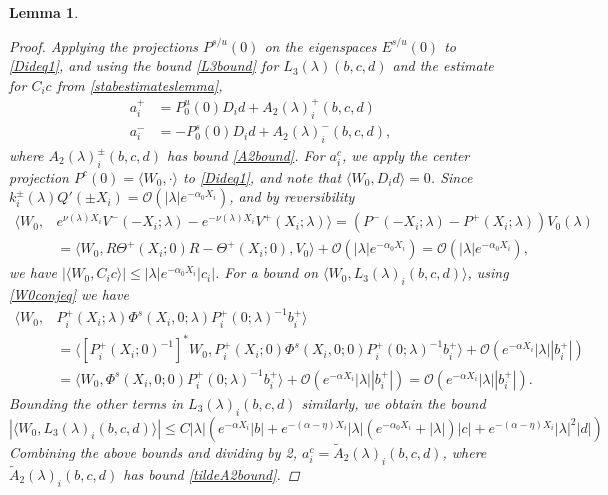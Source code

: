\documentclass[10pt,reqno]{amsart}
\theoremstyle{plain}
\newtheorem{lemma}[theorem]{Lemma}
\theoremstyle{definition}
\theoremstyle{remark}
\numberwithin{theorem}{section}
\numberwithin{equation}{section}
\begin{document}
\begin{lemma}
\begin{proof}
Applying the projections $P^{s/u}(0)$ on the eigenspaces $E^{s/u}(0)$ to \eqref{Dideq1}, and using the bound \cref{L3bound} for $L_3(\lambda)(b, c, d)$ and the estimate for $C_i c$ from \cref{stabestimateslemma},
\begin{align*}
a_i^+ &= P_0^u(0) D_i d + A_2(\lambda)_i^+(b, c, d) \\
a_i^- &= -P_0^s(0) D_i d + A_2(\lambda)_i^-(b, c, d),
\end{align*}
where $A_2(\lambda)_i^\pm(b, c, d)$ has bound \cref{A2bound}. For $a_i^c$, we apply the center projection $P^c(0) = \langle W_0, \cdot \rangle$ to \eqref{Dideq1}, and note that $\langle W_0, D_i d\rangle = 0$. Since $k_i^\pm(\lambda)Q'(\pm X_i) = \mathcal{O}(|\lambda|e^{-\alpha_0 X_i})$, and by reversibility
\begin{align*}
\langle W_0, &e^{\nu(\lambda) X_i} V^-(-X_i; \lambda) - e^{-\nu(\lambda) X_i} V^+(X_i; \lambda) \rangle = \left( P^-(-X_i; \lambda) - P^+(X_i; \lambda) \right) V_0(\lambda) \\
&= \langle W_0, R \Theta^+(X_i; 0) R - \Theta^+(X_i; 0), V_0 \rangle + \mathcal{O}(|\lambda|e^{-\alpha_0 X_i}) = \mathcal{O}(|\lambda|e^{-\alpha_0 X_i}),
\end{align*}
we have $|\langle W_0, C_i c\rangle| \leq |\lambda|e^{-\alpha_0 X_i}|c_i|$. For a bound on $\langle W_0, L_3(\lambda)_i(b,c,d) \rangle$, using \cref{W0conjeq} we have
\begin{align*}
\langle W_0, &P_i^+(X_i; \lambda)\Phi^s(X_i, 0; \lambda) P_i^+(0; \lambda)^{-1} b_i^+ \rangle
\\
&= \langle [P_i^+(X_i; 0)^{-1}]^* W_0, P_i^+(X_i; 0)\Phi^s(X_i, 0; 0) P_i^+(0; \lambda)^{-1} b_i^+ \rangle + \mathcal{O}(e^{-\alpha X_i} |\lambda||b_i^+|) \\
&= \langle W_0, \Phi^s(X_i, 0; 0)  P_i^+(0; \lambda)^{-1} b_i^+ \rangle + \mathcal{O}(e^{-\alpha X_i} |\lambda||b_i^+|) = \mathcal{O}(e^{-\alpha X_i} |\lambda||b_i^+|).
\end{align*}
Bounding the other terms in $L_3(\lambda)_i(b, c, d)$ similarly, we obtain the bound
\begin{equation}\label{W0L3bound}
|\langle W_0, L_3(\lambda)_i(b, c, d) \rangle| \leq C |\lambda| \left( e^{-\alpha X_i} |b| + e^{-(\alpha - \eta)X_i} |\lambda|(e^{-\alpha_0 X_i} + |\lambda|) |c| + e^{-(\alpha - \eta)X_i} |\lambda|^2 |d| \right)
\end{equation}
Combining the above bounds and dividing by 2, $a_i^c = \tilde{A}_2(\lambda)_i(b, c, d)$, where $\tilde{A}_2(\lambda)_i(b, c, d)$ has bound \cref{tildeA2bound}.
\end{proof}
\end{lemma}
\end{document}
